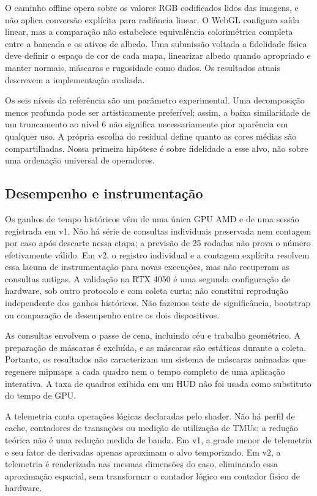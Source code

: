 O caminho offline opera sobre os valores RGB codificados lidos das imagens, e não aplica conversão explícita para radiância linear. O WebGL configura saída linear, mas a comparação não estabelece equivalência colorimétrica completa entre a bancada e os ativos de albedo. Uma submissão voltada a fidelidade física deve definir o espaço de cor de cada mapa, linearizar albedo quando apropriado e manter normais, máscaras e rugosidade como dados. Os resultados atuais descrevem a implementação avaliada.

Os seis níveis da referência são um parâmetro experimental. Uma decomposição menos profunda pode ser artisticamente preferível; assim, a baixa similaridade de um truncamento ao nível 6 não significa necessariamente pior aparência em qualquer uso. A própria escolha do residual define quanto as cores médias são compartilhadas. Nossa primeira hipótese é sobre fidelidade a esse alvo, não sobre uma ordenação universal de operadores.

\subsection{Desempenho e instrumentação}
Os ganhos de tempo históricos vêm de uma única GPU AMD e de uma sessão registrada em v1. Não há série de consultas individuais preservada nem contagem por caso após descarte nessa etapa; a previsão de 25 rodadas não prova o número efetivamente válido. Em v2, o registro individual e a contagem explícita resolvem essa lacuna de instrumentação para novas execuções, mas não recuperam as consultas antigas. A validação na RTX 4050 é uma segunda configuração de hardware, sob outro protocolo e com coleta curta; não constitui reprodução independente dos ganhos históricos. Não fazemos teste de significância, bootstrap ou comparação de desempenho entre os dois dispositivos.

As consultas envolvem o passe de cena, incluindo céu e trabalho geométrico. A preparação de máscaras é excluída, e as máscaras são estáticas durante a coleta. Portanto, os resultados não caracterizam um sistema de máscaras animadas que regenere mipmaps a cada quadro nem o tempo completo de uma aplicação interativa. A taxa de quadros exibida em um HUD não foi usada como substituto do tempo de GPU.

A telemetria conta operações lógicas declaradas pelo shader. Não há perfil de cache, contadores de transações ou medição de utilização de TMUs; a redução teórica não é uma redução medida de banda. Em v1, a grade menor de telemetria e seu fator de derivadas apenas aproximam o alvo temporizado. Em v2, a telemetria é renderizada nas mesmas dimensões do caso, eliminando essa aproximação espacial, sem transformar o contador lógico em contador físico de hardware.

